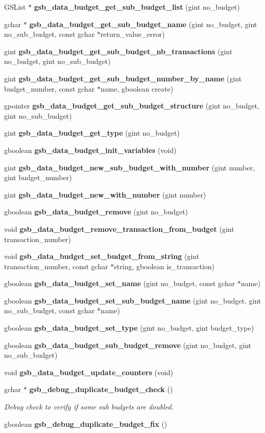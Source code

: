 \begin{DoxyCompactItemize}
\item 
GSList $\ast$ {\bf gsb\_\-data\_\-budget\_\-get\_\-sub\_\-budget\_\-list} (gint no\_\-budget)
\item 
gchar $\ast$ {\bf gsb\_\-data\_\-budget\_\-get\_\-sub\_\-budget\_\-name} (gint no\_\-budget, gint no\_\-sub\_\-budget, const gchar $\ast$return\_\-value\_\-error)
\item 
gint {\bf gsb\_\-data\_\-budget\_\-get\_\-sub\_\-budget\_\-nb\_\-transactions} (gint no\_\-budget, gint no\_\-sub\_\-budget)
\item 
gint {\bf gsb\_\-data\_\-budget\_\-get\_\-sub\_\-budget\_\-number\_\-by\_\-name} (gint budget\_\-number, const gchar $\ast$name, gboolean create)
\item 
gpointer {\bf gsb\_\-data\_\-budget\_\-get\_\-sub\_\-budget\_\-structure} (gint no\_\-budget, gint no\_\-sub\_\-budget)
\item 
gint {\bf gsb\_\-data\_\-budget\_\-get\_\-type} (gint no\_\-budget)
\item 
gboolean {\bf gsb\_\-data\_\-budget\_\-init\_\-variables} (void)
\item 
gint {\bf gsb\_\-data\_\-budget\_\-new\_\-sub\_\-budget\_\-with\_\-number} (gint number, gint budget\_\-number)
\item 
gint {\bf gsb\_\-data\_\-budget\_\-new\_\-with\_\-number} (gint number)
\item 
gboolean {\bf gsb\_\-data\_\-budget\_\-remove} (gint no\_\-budget)
\item 
void {\bf gsb\_\-data\_\-budget\_\-remove\_\-transaction\_\-from\_\-budget} (gint transaction\_\-number)
\item 
void {\bf gsb\_\-data\_\-budget\_\-set\_\-budget\_\-from\_\-string} (gint transaction\_\-number, const gchar $\ast$string, gboolean is\_\-transaction)
\item 
gboolean {\bf gsb\_\-data\_\-budget\_\-set\_\-name} (gint no\_\-budget, const gchar $\ast$name)
\item 
gboolean {\bf gsb\_\-data\_\-budget\_\-set\_\-sub\_\-budget\_\-name} (gint no\_\-budget, gint no\_\-sub\_\-budget, const gchar $\ast$name)
\item 
gboolean {\bf gsb\_\-data\_\-budget\_\-set\_\-type} (gint no\_\-budget, gint budget\_\-type)
\item 
gboolean {\bf gsb\_\-data\_\-budget\_\-sub\_\-budget\_\-remove} (gint no\_\-budget, gint no\_\-sub\_\-budget)
\item 
void {\bf gsb\_\-data\_\-budget\_\-update\_\-counters} (void)
\item 
gchar $\ast$ {\bf gsb\_\-debug\_\-duplicate\_\-budget\_\-check} ()
\begin{DoxyCompactList}\small\item\em Debug check to verify if some sub budgets are doubled. \item\end{DoxyCompactList}\item 
gboolean {\bf gsb\_\-debug\_\-duplicate\_\-budget\_\-fix} ()
\end{DoxyCompactItemize}


